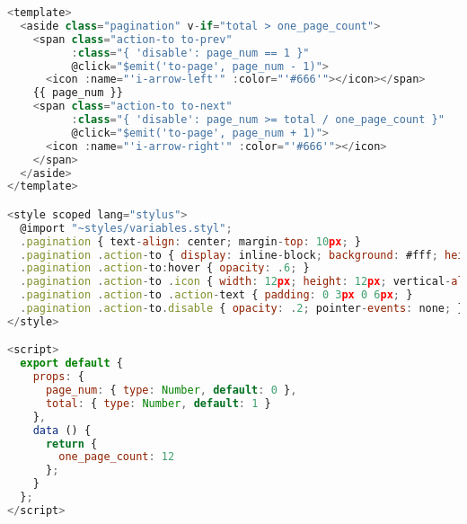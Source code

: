 \begin{lstlisting}[language=JavaScript]
<template>
  <aside class="pagination" v-if="total > one_page_count">
    <span class="action-to to-prev"
          :class="{ 'disable': page_num == 1 }"
          @click="$emit('to-page', page_num - 1)">
      <icon :name="'i-arrow-left'" :color="'#666'"></icon></span>
    {{ page_num }}
    <span class="action-to to-next"
          :class="{ 'disable': page_num >= total / one_page_count }"
          @click="$emit('to-page', page_num + 1)">
      <icon :name="'i-arrow-right'" :color="'#666'"></icon>
    </span>
  </aside>
</template>

<style scoped lang="stylus">
  @import "~styles/variables.styl";
  .pagination { text-align: center; margin-top: 10px; }
  .pagination .action-to { display: inline-block; background: #fff; height: row_height_2; line-height: row_height_2_inner; padding: 2px 8px; border-radius: 16px; color: gray_1; min-width: row_height_2; cursor: pointer; transition: all .1s; font-weight: bold; text-align: center; }
  .pagination .action-to:hover { opacity: .6; }
  .pagination .action-to .icon { width: 12px; height: 12px; vertical-align: -2px; }
  .pagination .action-to .action-text { padding: 0 3px 0 6px; }
  .pagination .action-to.disable { opacity: .2; pointer-events: none; }
</style>

<script>
  export default {
    props: {
      page_num: { type: Number, default: 0 },
      total: { type: Number, default: 1 }
    },
    data () {
      return {
        one_page_count: 12
      };
    }
  };
</script>


\end{lstlisting}




\begin{lstlisting}[language=JavaScript]

\end{lstlisting}



\begin{lstlisting}[language=JavaScript]

\end{lstlisting}



\begin{lstlisting}[language=JavaScript]

\end{lstlisting}




\begin{lstlisting}[language=JavaScript]

\end{lstlisting}




